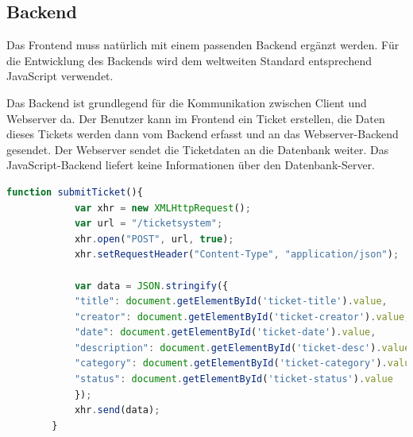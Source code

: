 \documentclass{scrartcl}
\begin{document}
\begin{flushleft}
    \subsection{Backend}
    Das Frontend muss natürlich mit einem passenden Backend ergänzt werden. Für die Entwicklung des Backends wird dem weltweiten Standard entsprechend JavaScript verwendet. \newline

    Das Backend ist grundlegend für die Kommunikation zwischen Client und Webserver da. Der Benutzer kann im Frontend ein Ticket erstellen, die Daten dieses Tickets werden dann vom Backend erfasst und an das Webserver-Backend gesendet. Der Webserver sendet die Ticketdaten an die Datenbank weiter.  
    Das JavaScript-Backend liefert keine Informationen über den Datenbank-Server.

    \begin{lstlisting}[language=JavaScript, caption={Backend Funktion: submitTicket}, captionpos=t]
        function submitTicket(){
            var xhr = new XMLHttpRequest();
            var url = "/ticketsystem";
            xhr.open("POST", url, true);
            xhr.setRequestHeader("Content-Type", "application/json");
            
            var data = JSON.stringify({
            "title": document.getElementById('ticket-title').value,
            "creator": document.getElementById('ticket-creator').value,
            "date": document.getElementById('ticket-date').value,
            "description": document.getElementById('ticket-desc').value,
            "category": document.getElementById('ticket-category').value,
            "status": document.getElementById('ticket-status').value 
            });
            xhr.send(data);
        }\end{lstlisting}


\end{flushleft}
\end{document}
